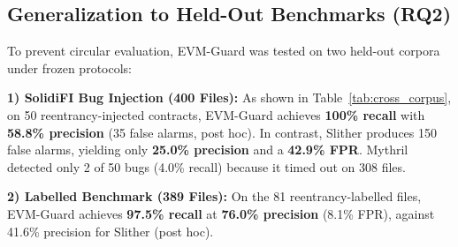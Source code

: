 \documentclass[conference]{IEEEtran}
\begin{document}
\subsection{Generalization to Held-Out Benchmarks (RQ2)}
To prevent circular evaluation, EVM-Guard was tested on two held-out corpora under frozen protocols:

\smallskip
\noindent\textbf{1) SolidiFI Bug Injection (400 Files):} As shown in Table~\ref{tab:cross_corpus}, on 50 reentrancy-injected contracts, EVM-Guard achieves \textbf{100\% recall} with \textbf{58.8\% precision} (35 false alarms, post hoc). In contrast, Slither produces 150 false alarms, yielding only \textbf{25.0\% precision} and a \textbf{42.9\% FPR}. Mythril detected only 2 of 50 bugs (4.0\% recall) because it timed out on 308 files.

\smallskip
\noindent\textbf{2) Labelled Benchmark (389 Files):} On the 81 reentrancy-labelled files, EVM-Guard achieves \textbf{97.5\% recall} at \textbf{76.0\% precision} (8.1\% FPR), against 41.6\% precision for Slither (post hoc).

\begin{table}[h]
\centering
\small
\renewcommand{\arraystretch}{1.12}
\caption{Cross-Corpus Reentrancy Performance Across the Three Real Benchmarks. EVM-Guard is engine v5. All rows are post hoc, because the engine was developed on these files.}
\label{tab:cross_corpus}
\end{table}
\end{document}
